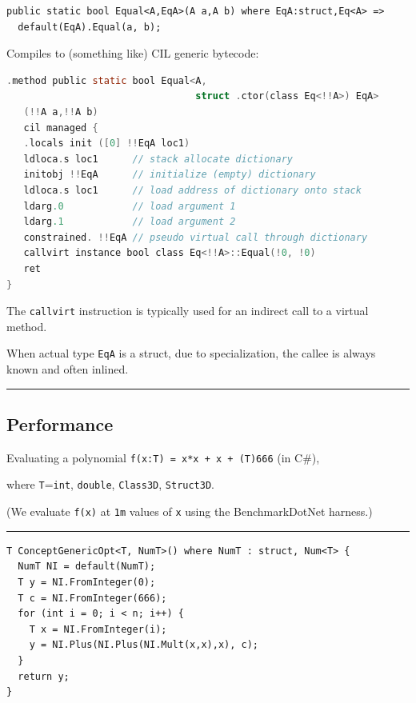 \begin{lstlisting}
public static bool Equal<A,EqA>(A a,A b) where EqA:struct,Eq<A> =>
  default(EqA).Equal(a, b);
\end{lstlisting}

Compiles to (something like) CIL generic bytecode:

\begin{lstlisting}[language=C]
.method public static bool Equal<A, 
                                 struct .ctor(class Eq<!!A>) EqA> 
   (!!A a,!!A b) 
   cil managed {
   .locals init ([0] !!EqA loc1)
   ldloca.s loc1      // stack allocate dictionary
   initobj !!EqA      // initialize (empty) dictionary
   ldloca.s loc1      // load address of dictionary onto stack
   ldarg.0            // load argument 1   
   ldarg.1            // load argument 2
   constrained. !!EqA // pseudo virtual call through dictionary
   callvirt instance bool class Eq<!!A>::Equal(!0, !0) 
   ret
}
\end{lstlisting}

The \lstinline!callvirt! instruction is typically used for an indirect
call to a virtual method.

When actual type \lstinline!EqA! is a struct, due to specialization, the
callee is always known and often inlined.

\begin{center}\rule{0.5\linewidth}{\linethickness}\end{center}

\subsection{Performance}\label{performance}

Evaluating a polynomial \lstinline!f(x:T) = x*x + x + (T)666! (in C\#),

where \lstinline!T!=\lstinline!int!, \lstinline!double!,
\lstinline!Class3D!, \lstinline!Struct3D!.

(We evaluate \lstinline!f(x)! at \lstinline!1m! values of \lstinline!x!
using the BenchmarkDotNet harness.)

\begin{center}\rule{0.5\linewidth}{\linethickness}\end{center}

\begin{lstlisting}
T ConceptGenericOpt<T, NumT>() where NumT : struct, Num<T> {
  NumT NI = default(NumT);
  T y = NI.FromInteger(0);
  T c = NI.FromInteger(666);
  for (int i = 0; i < n; i++) {
    T x = NI.FromInteger(i);
    y = NI.Plus(NI.Plus(NI.Mult(x,x),x), c);
  }
  return y;
}
\end{lstlisting}

